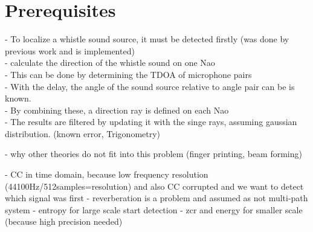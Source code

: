 \chapter{Prerequisites}

- To localize a whistle sound source, it must be detected firstly (was done by previous work
and is implemented)\\
- calculate the direction of the whistle sound on one Nao\\
- This can be done by determining the \ac{TDOA} of microphone pairs\\
- With the delay, the angle of the sound source relative to angle pair
can be is known.\\
- By combining these, a direction ray is defined on each Nao\\
- The results are filtered by updating it with the singe rays, assuming
gaussian distribution. (known error, Trigonometry)

- why other theories do not fit into this problem
(finger printing, beam forming)

- CC in time domain, because low frequency resolution (44100Hz/512samples=resolution)
and also \ac{CC} corrupted and we want to detect which signal was first
- reverberation is a problem and assumed as not multi-path system
- entropy for large scale start detection
- zcr and energy for smaller scale (because high precision needed)







%
%


%
